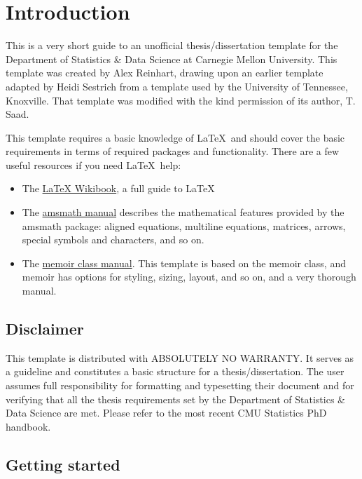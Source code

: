 \chapter{Introduction}
\label{ch:introduction}

This is a very short guide to an unofficial thesis/dissertation template for the
Department of Statistics \& Data Science at Carnegie Mellon University. This
template was created by Alex Reinhart, drawing upon an earlier template adapted
by Heidi Sestrich from a template used by the University of Tennessee,
Knoxville. That template was modified with the kind permission of its author, T.
Saad.

This template requires a basic knowledge of \LaTeX\ and should cover the basic
requirements in terms of required packages and functionality. There are a few
useful resources if you need \LaTeX\ help:
\begin{itemize}
\item The \href{https://en.wikibooks.org/wiki/LaTeX}{LaTeX Wikibook}, a full
  guide to \LaTeX
\item The
  \href{http://mirrors.ctan.org/macros/latex/required/amsmath/amsldoc.pdf}{amsmath
    manual} describes the mathematical features provided by the amsmath package:
  aligned equations, multiline equations, matrices, arrows, special symbols and
  characters, and so on.
\item The
  \href{http://mirrors.ctan.org/macros/latex/contrib/memoir/memman.pdf}{memoir
    class manual}. This template is based on the memoir class, and memoir has
  options for styling, sizing, layout, and so on, and a very thorough manual.
\end{itemize}

\section{Disclaimer}

This template is distributed with ABSOLUTELY NO WARRANTY. It serves as a
guideline and constitutes a basic structure for a thesis/dissertation. The user
assumes full responsibility for formatting and typesetting their document and
for verifying that all the thesis requirements set by the Department of
Statistics \& Data Science are met. Please refer to the most recent CMU
Statistics PhD handbook.

\section{Getting started}

